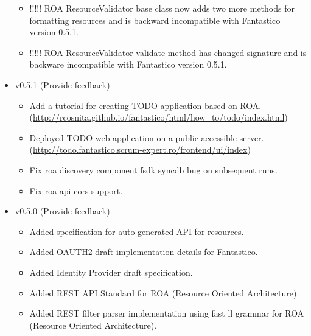 \documentclass[letterpaper,10pt,english]{sphinxmanual}
\begin{document}
\begin{itemize}
\begin{itemize}
\item {} 
!!!!! ROA ResourceValidator base class now adds two more methods for formatting resources and is backward incompatible with Fantastico version 0.5.1.

\item {} 
!!!!! ROA ResourceValidator validate method has changed signature and is backware incompatible with Fantastico version 0.5.1.

\end{itemize}

\item {} 
v0.5.1 (\href{https://docs.google.com/forms/d/1tKBopU3lfDB\_w8F4h7Rl1Rn4uydAJq-nha09L\_ptJck/edit?usp=sharing}{Provide feedback})
\begin{itemize}
\item {} 
Add a tutorial for creating TODO application based on ROA. (\href{http://rcosnita.github.io/fantastico/html/how\_to/todo/index.html}{http://rcosnita.github.io/fantastico/html/how\_to/todo/index.html})

\item {} 
Deployed TODO web application on a public accessible server. (\href{http://todo.fantastico.scrum-expert.ro/frontend/ui/index}{http://todo.fantastico.scrum-expert.ro/frontend/ui/index})

\item {} 
Fix roa discovery component fsdk syncdb bug on subsequent runs.

\item {} 
Fix roa api cors support.

\end{itemize}

\item {} 
v0.5.0 (\href{https://docs.google.com/forms/d/1tKBopU3lfDB\_w8F4h7Rl1Rn4uydAJq-nha09L\_ptJck/edit?usp=sharing}{Provide feedback})
\begin{itemize}
\item {} 
Added specification for auto generated API for resources.

\item {} 
Added OAUTH2 draft implementation details for Fantastico.

\item {} 
Added Identity Provider draft specification.

\item {} 
Added REST API Standard for ROA (Resource Oriented Architecture).

\item {} 
Added REST filter parser implementation using fast ll grammar for ROA (Resource Oriented Architecture).


\end{itemize}
\end{itemize}
\end{document}
